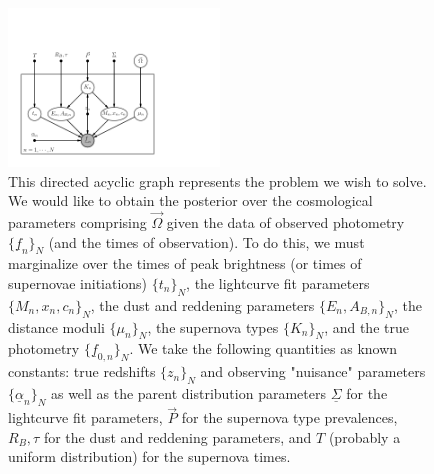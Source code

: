 \documentclass[12pt, onecolumn]{emulateapj}
\newcommand{\textul}{\underline}
\begin{document}
\begin{figure}
\vspace{0.5cm}
\begin{center}
\includegraphics[width=0.5\textwidth]{sn-draft.png}
\caption{This directed acyclic graph represents the problem we wish to solve.  We would like to obtain the posterior over the cosmological parameters comprising $\vec{\Omega}$ given the data of observed photometry $\{\textul{f}_{n}\}_{N}$ (and the times of observation).  To do this, we must marginalize over the times of peak brightness (or times of supernovae initiations) $\{t_{n}\}_{N}$, the lightcurve fit parameters $\{M_{n},x_{n},c_{n}\}_{N}$, the dust and reddening parameters $\{E_{n},A_{B,n}\}_{N}$, the distance moduli $\{\mu_{n}\}_{N}$, the supernova types $\{K_{n}\}_{N}$, and the true photometry $\{\textul{f}_{0,n}\}_{N}$.  We take the following quantities as known constants: true redshifts $\{z_{n}\}_{N}$ and observing "nuisance" parameters $\{\textul{\alpha}_{n}\}_{N}$ as well as the parent distribution parameters $\textul{\Sigma}$ for the lightcurve fit parameters, $\vec{P}$ for the supernova type prevalences, $R_{B},\tau$ for the dust and reddening parameters, and $T$ (probably a uniform distribution) for the supernova times.}
\label{fig:pgm}
\end{center}
\end{figure}
%
%
\end{document}
